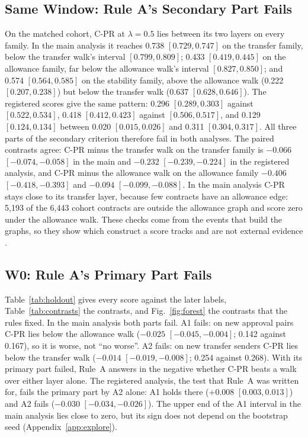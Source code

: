 \documentclass{ieeeaccess}
\newcommand{\cpr}{\mbox{C-PR}}
\begin{document}
\subsection{Same Window: Rule A's Secondary Part Fails}
\label{sec:res-window}
On the matched cohort, \cpr{} at $\lambda=0.5$ lies between its two layers on every family. In the main analysis it reaches 0.738 $[0.729,0.747]$ on the transfer family, below the transfer walk's interval $[0.799,0.809]$; 0.433 $[0.419,0.445]$ on the allowance family, far below the allowance walk's interval $[0.827,0.850]$; and 0.574 $[0.564,0.585]$ on the stability family, above the allowance walk (0.222 $[0.207,0.238]$) but below the transfer walk (0.637 $[0.628,0.646]$). The registered scores give the same pattern: 0.296 $[0.289,0.303]$ against $[0.522,0.534]$, 0.418 $[0.412,0.423]$ against $[0.506,0.517]$, and 0.129 $[0.124,0.134]$ between 0.020 $[0.015,0.026]$ and 0.311 $[0.304,0.317]$. All three parts of the secondary criterion therefore fail in both analyses. The paired contrasts agree: \cpr{} minus the transfer walk on the transfer family is $-0.066$ $[-0.074,-0.058]$ in the main and $-0.232$ $[-0.239,-0.224]$ in the registered analysis, and \cpr{} minus the allowance walk on the allowance family $-0.406$ $[-0.418,-0.393]$ and $-0.094$ $[-0.099,-0.088]$. In the main analysis \cpr{} stays close to its transfer layer, because few contracts have an allowance edge: 5,193 of the 6,443 cohort contracts are outside the allowance graph and score zero under the allowance walk. These checks come from the events that build the graphs, so they show which construct a score tracks and are not external evidence \cite{cronbach1955construct}.

\subsection{W0: Rule A's Primary Part Fails}
Table~\ref{tab:holdout} gives every score against the later labels, Table~\ref{tab:contrasts} the contrasts, and Fig.~\ref{fig:forest} the contrasts that the rules fixed. In the main analysis both parts fail. A1 fails: on new approval pairs \cpr{} lies below the allowance walk ($-0.025$ $[-0.045,-0.004]$; 0.142 against 0.167), so it is worse, not ``no worse''. A2 fails: on new transfer senders \cpr{} lies below the transfer walk ($-0.014$ $[-0.019,-0.008]$; 0.254 against 0.268). With its primary part failed, Rule~A answers in the negative whether \cpr{} beats a walk over either layer alone. The registered analysis, the test that Rule~A was written for, fails the primary part by A2 alone: A1 holds there ($+0.008$ $[0.003,0.013]$) and A2 fails ($-0.030$ $[-0.034,-0.026]$). The upper end of the A1 interval in the main analysis lies close to zero, but its sign does not depend on the bootstrap seed (Appendix~\ref{app:explore}).
\end{document}
